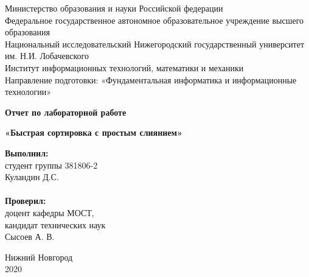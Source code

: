 \documentclass{report}
\begin{document}
\begin{titlepage}
\begin{center}
Министерство образования и науки Российской федерации \\
Федеральное государственное автономное образовательное учреждение высшего образования \\
Национальный исследовательский Нижегородский государственный университет им. Н.И. Лобачевского \\
Институт информационных технологий, математики и механики \\
Направление подготовки: «Фундаментальная информатика и информационные технологии»
\end{center}

\vspace{4em}

\begin{center}
\textbf{\Large Отчет по лабораторной работе}
\end{center}
\begin{center}
\textbf{\Large «Быстрая сортировка с простым слиянием»}
\end{center}

\vspace{4em}

\newbox{\lbox}
\newlength{\maxl}
\setlength{\maxl}{\wd\lbox}
\hfill\parbox{7cm}{
\textbf{Выполнил:} \\ 
студент группы 381806-2 \\ 
Куландин Д.С.\\
\\
\textbf{Проверил:}\\ 
доцент кафедры МОСТ, \\ 
кандидат технических наук \\ 
Сысоев А. В.\\ }
\vspace{\fill}

\begin{center} Нижний Новгород \\ 2020 \end{center}

\end{titlepage}

\setcounter{page}{2}

\tableofcontents
\newpage

\end{document}
